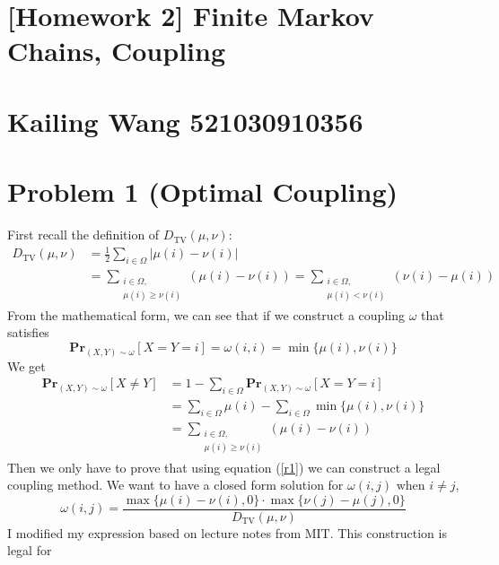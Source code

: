 \documentclass{article}
\theoremstyle{definition}
\begin{document}
	
	\section*{\LARGE [Homework 2] Finite Markov Chains, Coupling}
	\section*{\large Kailing Wang 521030910356}
	
	\section*{Problem 1 (Optimal Coupling)}
	First recall the definition of $D_{\operatorname{TV}}(\mu, \nu)$:
	$$
	\begin{aligned}
		D_{\operatorname{TV}}(\mu, \nu) & = \frac{1}{2}\underset{i \in \Omega}{\sum}|\mu(i)-\nu(i)|\\
		& = \underset{\substack{ i \in \Omega, \\ \mu(i)\geq\nu(i)}}{\sum}\left(\mu(i)-\nu(i)\right) = \underset{\substack{ i \in \Omega, \\ \mu(i)<\nu(i)}}{\sum}\left(\nu(i)-\mu(i)\right)
	\end{aligned}	
	$$
	From the mathematical form, we can see that if we construct a coupling $\omega$ that satisfies
	\begin{equation}
		\mathbf{Pr}_{(X,Y)\sim\omega}[X=Y=i]=\omega(i, i)=\min\{\mu(i), \nu(i)\}
		\label{r1}
	\end{equation}
	We get 
	$$
	\begin{aligned}
		\mathbf{Pr}_{(X,Y)\sim\omega}[X\neq Y] & = 1-\underset{i \in \Omega}{\sum}\mathbf{Pr}_{(X,Y)\sim\omega}[X = Y = i] \\ 
		& = \underset{i \in \Omega}{\sum}\mu(i)-\underset{i \in \Omega}{\sum}\min\{\mu(i), \nu(i)\} \\
		& = \underset{\substack{ i \in \Omega, \\ \mu(i)\geq\nu(i)}}{\sum}\left(\mu(i)-\nu(i)\right)
	\end{aligned}
	$$
	Then we only have to prove that using equation (\ref{r1}) we can construct a legal coupling method. We want to have a closed form solution for $\omega(i,j)\text{ when } i\neq j$, 
	\begin{equation}
		\omega(i,j) = \frac{\max \{\mu(i)-\nu(i), 0\} \cdot \max \{\nu(j)-\mu(j), 0\}}{D_{\operatorname{TV}}(\mu, \nu)}
	\end{equation}
	\noindent I modified my expression based on lecture notes from MIT\cite{mit3}. This construction is legal for
\end{document}
